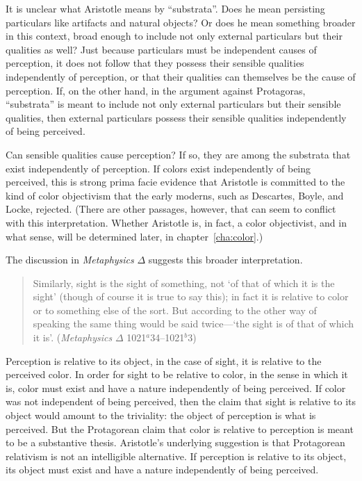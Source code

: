 It is unclear what Aristotle means by ``substrata''. Does he mean persisting particulars like artifacts and natural objects? Or does he mean something broader in this context, broad enough to include not only external particulars but their qualities as well? Just because particulars must be independent causes of perception, it does not follow that they possess their sensible qualities independently of perception, or that their qualities can themselves be the cause of perception. If, on the other hand, in the argument against Protagoras, ``substrata'' is meant to include not only external particulars but their sensible qualities, then external particulars possess their sensible qualities independently of being perceived. 

Can sensible qualities cause perception? If so, they are among the substrata that exist independently of perception. If colors exist independently of being perceived, this is strong prima facie evidence that Aristotle is committed to the kind of color objectivism that the early moderns, such as Descartes, Boyle, and Locke, rejected. (There are other passages, however, that can seem to conflict with this interpretation. Whether Aristotle is, in fact, a color objectivist, and in what sense, will be determined later, in chapter~\ref{cha:color}.) 

The discussion in \emph{Metaphysics} \( \Delta \) suggests this broader interpretation.
\begin{quote}
	Similarly, sight is the sight of something, not `of that of which it is the sight' (though of course it is true to say this); in fact it is relative to color or to something else of the sort. But according to the other way of speaking the same thing would be said twice---`the sight is of that of which it is'. (\emph{Metaphysics} \( \Delta \) 1021\( ^{a} \)34--1021\( ^{b} \)3)
\end{quote}
Perception is relative to its object, in the case of sight, it is relative to the perceived color. In order for sight to be relative to color, in the sense in which it is, color must exist and have a nature independently of being perceived. If color was not independent of being perceived, then the claim that sight is relative to its object would amount to the triviality: the object of perception is what is perceived. But the Protagorean claim that color is relative to perception is meant to be a substantive thesis. Aristotle's underlying suggestion is that Protagorean relativism is not an intelligible alternative. If perception is relative to its object, its object must exist and have a nature independently of being perceived.

